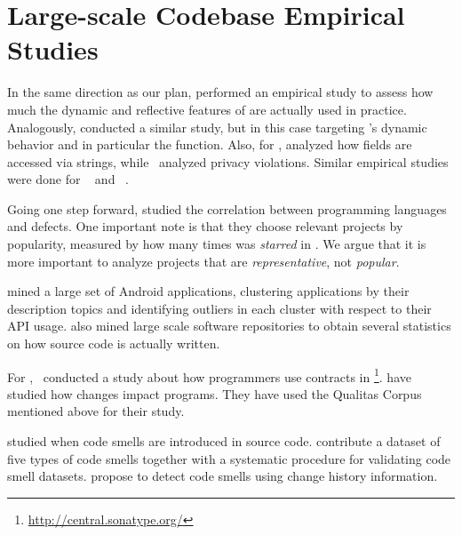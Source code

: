 \section{Large-scale Codebase Empirical Studies}
\label{sec:lr:largescale}

In the same direction as our plan,
\cite{callauHowWhyDevelopers2013} performed an empirical study to assess
how much the dynamic and reflective features of \smalltalk{} are actually
used in practice.
Analogously, \cite{richardsAnalysisDynamicBehavior2010,richardsEvalThatMen2011,weiEmpiricalStudyDynamic2016}
conducted a similar study, but in this case targeting \javascript's dynamic
behavior and in particular the  function.
Also, for \javascript{}, \cite{madsenStringAnalysisDynamic2014} analyzed
how fields are accessed via strings,
while~\cite{jangEmpiricalStudyPrivacyviolating2010}
analyzed privacy violations.
Similar empirical studies were done for
\php~\citep{hillsEmpiricalStudyPHP2013,dahseExperienceReportEmpirical2015,doyleEmpiricalStudyEvolution2011}
and \swift~\citep{reboucasEmpiricalStudyUsage2016}.  

Going one step forward, \cite{rayLargescaleStudyProgramming2017} studied the correlation between programming languages and defects. 
One important note is that they choose relevant projects by popularity,
measured by how many times was \emph{starred} in \github.
We argue that it is more important to analyze projects that are \emph{representative}, not \emph{popular}.

\cite{gorlaCheckingAppBehavior2014} mined a large set of Android applications, clustering applications by their description topics and identifying outliers in each cluster with respect to their API usage.
\cite{grechanikEmpiricalInvestigationLargescale2010} also mined large scale software repositories to obtain several statistics on how source code is actually written.

For \java{},~\cite{dietrichContractsWildStudy2017a} conducted a study
about how programmers use contracts in \mavencentral{}\footnote{\url{http://central.sonatype.org/}}.
\cite{dietrichBrokenPromisesEmpirical2014} have studied how
\api{} changes impact \java{} programs.
They have used the Qualitas Corpus~\citep{temperoQualitasCorpusCurated2010} mentioned above for their study.

\cite{tufanoWhenWhyYour2015,tufanoWhenWhyYour2017} studied when code
smells are introduced in source code.
\cite{palombaLandfillOpenDataset2015}
contribute a dataset of five types of code smells together with a systematic procedure for validating code smell datasets.
\cite{palombaDetectingBadSmells2013} propose to detect code smells using change history information.

